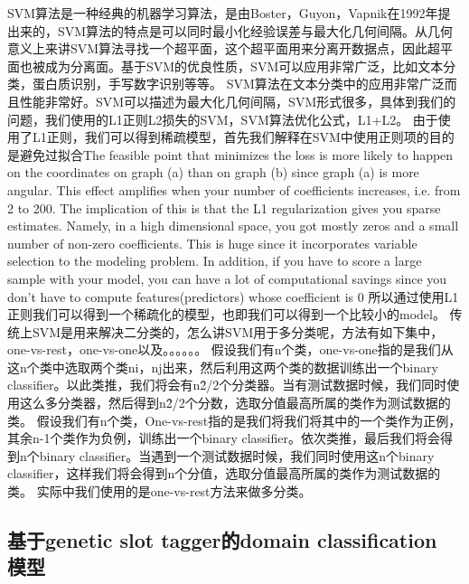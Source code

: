 \documentclass[master]{njuthesis}
\begin{document}
SVM算法是一种经典的机器学习算法，是由Boster，Guyon，Vapnik在1992年提出来的，SVM算法的特点是可以同时最小化经验误差与最大化几何间隔。从几何意义上来讲SVM算法寻找一个超平面，这个超平面用来分离开数据点，因此超平面也被成为分离面。基于SVM的优良性质，SVM可以应用非常广泛，比如文本分类，蛋白质识别，手写数字识别等等。
SVM算法在文本分类中的应用非常广泛而且性能非常好。SVM可以描述为最大化几何间隔，SVM形式很多，具体到我们的问题，我们使用的L1正则L2损失的SVM，SVM算法优化公式，L1+L2。
由于使用了L1正则，我们可以得到稀疏模型，首先我们解释在SVM中使用正则项的目的是避免过拟合The feasible point that minimizes the loss is more likely to happen on the coordinates on graph (a) than on graph (b) since graph (a) is more angular.  This effect amplifies when your number of coefficients increases, i.e. from 2 to 200. The implication of this is that the L1 regularization gives you sparse estimates. Namely, in a high dimensional space, you got mostly zeros and a small number of non-zero coefficients. This is huge since it incorporates variable selection to the modeling problem. In addition, if you have to score a large sample with your model, you can have a lot of computational savings since you don't have to compute features(predictors) whose coefficient is 0
所以通过使用L1正则我们可以得到一个稀疏化的模型，也即我们可以得到一个比较小的model。
传统上SVM是用来解决二分类的，怎么讲SVM用于多分类呢，方法有如下集中，one-vs-rest，one-vs-one以及。。。。。。
假设我们有n个类，one-vs-one指的是我们从这n个类中选取两个类ni，nj出来，然后利用这两个类的数据训练出一个binary classifier。以此类推，我们将会有n\^2/2个分类器。当有测试数据时候，我们同时使用这么多分类器，然后得到n\^2/2个分数，选取分值最高所属的类作为测试数据的类。
假设我们有n个类，One-vs-rest指的是我们将我们将其中的一个类作为正例，其余n-1个类作为负例，训练出一个binary classifier。依次类推，最后我们将会得到n个binary classifier。当遇到一个测试数据时候，我们同时使用这n个binary classifier，这样我们将会得到n个分值，选取分值最高所属的类作为测试数据的类。
实际中我们使用的是one-vs-rest方法来做多分类。


\subsection{基于genetic slot tagger的domain classification 模型}
\end{document}
